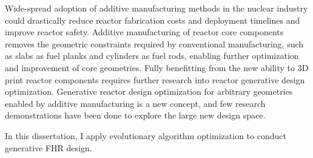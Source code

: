
Wide-spread adoption of additive manufacturing methods in the nuclear industry 
could drastically reduce reactor fabrication costs and deployment timelines 
and improve reactor safety. 
Additive manufacturing of reactor core components removes the geometric constraints
required by conventional manufacturing, such as slabs as fuel planks and cylinders 
as fuel rods, enabling further optimization and improvement of core geometries. 
Fully benefitting from the new ability to 3D print reactor components requires further 
research into reactor generative design optimization. 
Generative reactor design optimization for arbitrary geometries enabled by additive 
manufacturing is a new concept, and few research demonstrations have been done to 
explore the large new design space. 

In this dissertation, I apply evolutionary algorithm optimization to conduct generative 
\gls{FHR} design.


